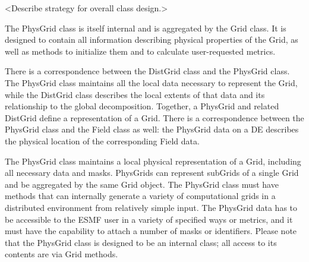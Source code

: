 %


<Describe strategy for overall class design.>


The PhysGrid class is itself internal and is aggregated by the Grid 
class.  It is designed to contain all information describing physical 
properties of the Grid, as well as methods to initialize them and to
calculate user-requested metrics.

There is a correspondence between the DistGrid class and the PhysGrid
class.  The PhysGrid class maintains all the local data necessary to
represent the Grid, while the DistGrid class describes the local extents
of that data and its relationship to the global decomposition.
Together, a PhysGrid and related DistGrid define a representation of
a Grid.  There is a correspondence between the PhysGrid class and the Field
class as well:  the PhysGrid data on a DE describes the physical location
of the corresponding Field data.

The PhysGrid class maintains a local physical representation of a Grid,
including all necessary data and masks.  PhysGrids can represent subGrids
of a single Grid and be aggregated by the same Grid object. The PhysGrid
class must have methods that can internally generate a variety of
computational grids in a distributed environment from relatively simple
input.  The PhysGrid data has to be accessible to the ESMF user in a
variety of specified ways or metrics, and it must have the capability to
attach a number of masks or identifiers.  Please note that the PhysGrid class
is designed to be an internal class; all access to its contents are via
Grid methods.

